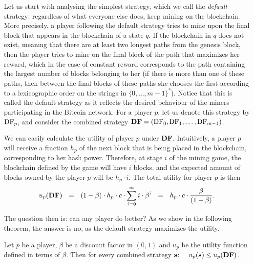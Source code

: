 Let us start with analysing the %
simplest strategy, which we call the \emph{default} strategy: regardless of what everyone else does, keep mining on the blockchain. 
More precisely, a player following the default strategy tries to mine upon the final block that appears in the blockchain of a state $q$. If the blockchain in $q$ does not exist, meaning that there are at least two longest paths from the genesis block, then the player tries to mine on the final block of the path that maximizes her reward, which in the case of constant 
reward corresponds to the path containing the largest number of blocks belonging to her  
(if there is more than one of these paths, then between the final blocks of these paths she chooses the first according to a lexicographic order on the strings in $\{0, \ldots, m-1\}^*$). 
Notice that this is called the default strategy as it reflects the desired behaviour of the miners participating in the Bitcoin network. For a player $p$, let us denote this strategy 
by $\text{\rm DF}_p$, and consider the combined strategy $\text{\rm {\bf DF}} = (\text{\rm DF}_0,\text{\rm DF}_1,\dots,\text{\rm DF}_{m-1})$. 

We can easily calculate the utility of player $p$ under $\text{\rm {\bf DF}}$. Intuitively, a player $p$ will receive a fraction $h_p$ of the next block that is being placed in the blockchain, corresponding to her hash power. Therefore, at stage $i$ of the mining game, the blockchain defined by the game will have $i$ blocks, and the expected amount of blocks owned by the player $p$ will be $h_p\cdot i$. The total utility for player $p$ is then
$$u_p(\cdf) \ \ = \ \ (1 - \beta) \cdot h_p \cdot c\cdot \sum_{i=0}^{\infty}i \cdot \beta^{i} \ \ = \ \ h_p\cdot c \cdot \frac{\beta}{(1-\beta)}.$$


The question then is: can any player do better? As we show in the following theorem, the answer is no, as the default strategy maximizes the utility. 
\begin{theorem}\label{thm-conts_dom_str}
Let $p$ be a player, $\beta$ be a discount factor in $(0,1)$ and $u_p$ be the utility function defined in terms of $\beta$. Then for every combined strategy $\mathbf{s}$: \ \ $u_p(\mathbf{s}) \leq u_p(\text{\rm {\bf DF}})$.
\end{theorem} 

